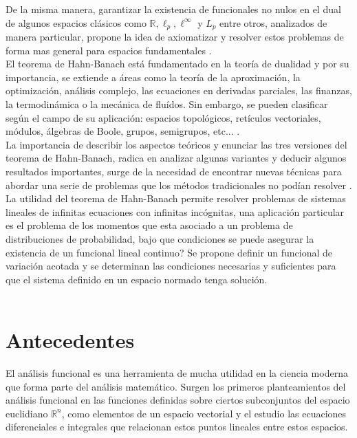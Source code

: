 \documentclass[10pt]{amsart}
\theoremstyle{remark}
\numberwithin{equation}{section}
\begin{document}
De la misma manera, garantizar la existencia de funcionales no nulos en el dual de algunos espacios clásicos como $\mathbb{R}, \ell_p, \ell^\infty$ y $L_p$ entre otros, analizados de manera particular, propone la idea de axiomatizar y resolver estos problemas de forma mas general para espacios fundamentales \cite{ArtAca01}.\\

El teorema de Hahn-Banach está fundamentado en la teoría de dualidad y por su importancia, se extiende a áreas como la teoría de la aproximación, la optimización, análisis complejo, las ecuaciones en derivadas parciales, las finanzas, la termodinámica o la mecánica de fluídos. Sin embargo, se pueden clasificar según el campo de su aplicación: espacios topológicos, retículos vectoriales, módulos, álgebras de Boole, grupos, semigrupos, etc... \cite{Tesis16}.\\

La importancia de describir los aspectos teóricos y enunciar las tres versiones del teorema de Hahn-Banach, radica en analizar algunas variantes y deducir algunos resultados importantes, surge de la necesidad de encontrar nuevas técnicas para abordar una serie de problemas que los métodos tradicionales no podían resolver \cite{ArtAca01}.\\

La utilidad del teorema de Hahn-Banach permite resolver problemas de sistemas lineales de infinitas ecuaciones con infinitas incógnitas, una aplicación particular es el problema de los momentos que esta asociado a un problema de distribuciones de probabilidad, bajo que condiciones se puede asegurar la existencia de un funcional lineal continuo? Se propone definir un funcional de variación acotada y se determinan las condiciones necesarias y suficientes para que el sistema definido en un espacio normado tenga solución.\\ \\


\section{Antecedentes}

El análisis funcional es una herramienta de mucha utilidad en la ciencia moderna que forma parte del análisis matemático. Surgen los primeros planteamientos del análisis funcional en las funciones definidas sobre ciertos subconjuntos del espacio euclidiano $\mathbb{R}^n$, como elementos de un espacio vectorial y el estudio las ecuaciones diferenciales e integrales que relacionan estos puntos lineales entre estos espacios.\\
\end{document}
